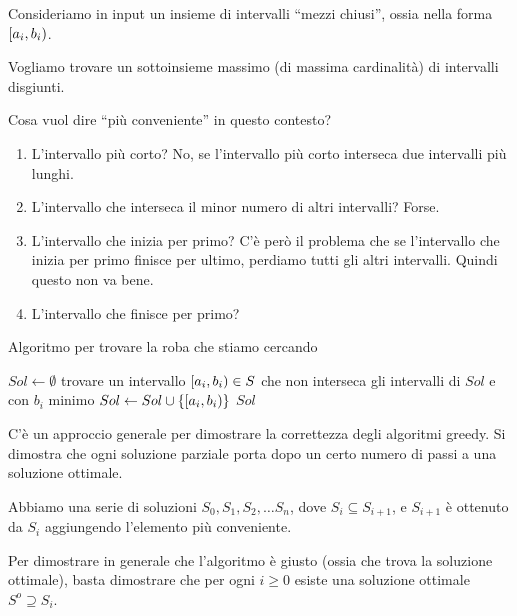 \begin{exmp}
Consideriamo in input un insieme di intervalli ``mezzi chiusi'', ossia nella forma $\left[ {a_i}, {b_i} \right)$.


Vogliamo trovare un sottoinsieme massimo (di massima cardinalit\`a) di intervalli disgiunti.

Cosa vuol dire ``pi\`u conveniente'' in questo contesto?
\begin{enumerate}
    \item L'intervallo pi\`u corto? No, se l'intervallo pi\`u corto interseca due intervalli pi\`u lunghi.
    \item L'intervallo che interseca il minor numero di altri intervalli? Forse.
    \item L'intervallo che inizia per primo? C'\`e per\`o il problema che se l'intervallo che inizia per primo finisce per ultimo, perdiamo tutti gli altri intervalli. Quindi questo non va bene.
    \item L'intervallo che finisce per primo?
\end{enumerate}

\begin{algorithm}
\caption{Algoritmo per trovare la roba che stiamo cercando}
\begin{algorithmic}[1]
    \State $Sol \gets \emptyset$
        \State trovare un intervallo $\left[ {a_i}, {b_i} \right) \in S$ che non interseca gli intervalli di $Sol$ e con $b_i$ minimo
        \State $Sol \gets Sol \cup \{ \left[ {a_i}, {b_i} \right) \}$
    \EndWhile
    \State \Return $Sol$
\EndFunction
\end{algorithmic}
\end{algorithm}

C'\`e un approccio generale per dimostrare la correttezza degli algoritmi greedy. Si dimostra che ogni soluzione parziale porta dopo un certo numero di passi a una soluzione ottimale.

Abbiamo una serie di soluzioni $S_0, S_1, S_2, \ldots S_n$, dove $S_{i} \subseteq S_{i+1}$, e $S_{i+1}$ \`e ottenuto da $S_i$ aggiungendo l'elemento pi\`u conveniente.

Per dimostrare in generale che l'algoritmo \`e giusto (ossia che trova la soluzione ottimale), basta dimostrare che per ogni $i \ge 0$ esiste una soluzione ottimale $S^{o} \supseteq S_i$.


\end{exmp}
